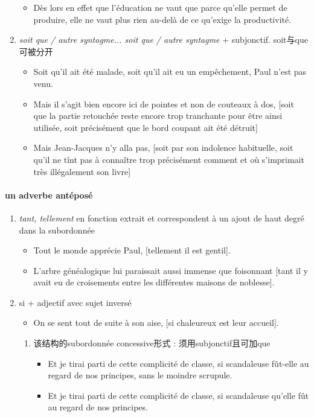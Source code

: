 \documentclass[UTF8]{report}
\begin{document}
\begin{enumerate}
\begin{itemize}
        \item Dès lors en effet que l’éducation ne vaut que parce qu’elle permet de produire, elle ne vaut plus rien au-delà de ce qu’exige la productivité.
    \end{itemize}
    \item \textit{soit que / autre syntagme... soit que / autre syntagme} + subjonctif. soit与que可被分开
    \begin{itemize}
        \item Soit qu’il ait été malade, soit qu’il ait eu un empêchement, Paul n’est pas venu.
        \item Mais il s’agit bien encore ici de pointes et non de couteaux à dos, [soit que la partie retouchée reste encore trop tranchante pour être ainsi utilisée, soit précisément que le bord coupant ait été détruit] 
        \item Mais Jean-Jacques n’y alla pas, [soit par son indolence habituelle, soit qu’il ne tînt pas à connaître trop précisément comment et où s’imprimait très illégalement son livre]
    \end{itemize}
\end{enumerate}

\paragraph{un adverbe antéposé}
\begin{enumerate}
    \item \textit{tant, tellement} en fonction extrait et correspondent à un ajout de haut degré dans la subordonnée
    \begin{itemize}
        \item Tout le monde apprécie Paul, [tellement il est gentil].
        \item L’arbre généalogique lui paraissait aussi immense que foisonnant [tant il y avait eu de croisements entre les différentes maisons de noblesse]. 
    \end{itemize}
    \item si + adjectif avec sujet inversé
    \begin{itemize}
        \item On se sent tout de suite à son aise, [si chaleureux est leur accueil].
    \end{itemize}
    \begin{enumerate}
        \item 该结构的subordonnée concessive形式 : 须用subjonctif且可加que
        \begin{itemize}
            \item Et je tirai parti de cette complicité de classe, si scandaleuse fût-elle au regard de nos principes, sans le moindre scrupule.
            \item Et je tirai parti de cette complicité de classe, si scandaleuse qu’elle fût au regard de nos principes.
        \end{itemize}
    \end{enumerate}
\end{enumerate}
\end{document}
